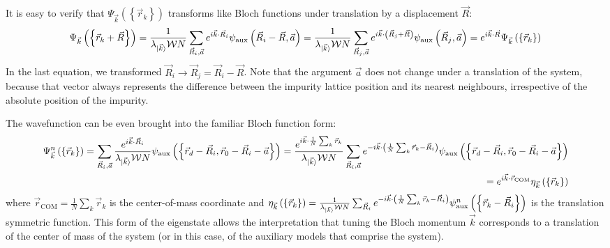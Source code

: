 \documentclass{report}
\numberwithin{equation}{section}
\begin{document}
\begin{appendices}
It is easy to verify that \(\Psi_{\vec k}\left(\left\{ \vec r_k \right\}  \right) \) transforms like Bloch functions under translation by a displacement \(\vec R\):
\begin{equation}\begin{aligned}
	\Psi_{\vec k}\left(\left\{\vec r_k + \vec R\right\} \right) = \frac{1}{\lambda_{\ket{\vec k}} \mathcal{W} N}\sum_{\vec R_i,\vec a} e^{i \vec{k}\cdot\vec{R}_i} \psi_\text{aux}\left(\vec R_i - \vec R, \vec a\right) = \frac{1}{\lambda_{\ket{\vec k}} \mathcal{W} N}\sum_{\vec R_j, \vec a} e^{i \vec{k}\cdot\left(\vec{R}_j + \vec R\right)} \psi_\text{aux}\left(\vec R_j, \vec a\right) = e^{i \vec{k}\cdot\vec{R}} \Psi_{\vec k}\left(\left\{ \vec r_k \right\} \right)
\end{aligned}\end{equation}
In the last equation, we transformed \(\vec R_i \to \vec R_j = \vec R_i - \vec R\). Note that the argument \(\vec a\) does not change under a translation of the system, because that vector always represents the difference between the impurity lattice position and its nearest neighbours, irrespective of the absolute position of the impurity.

The wavefunction can be even brought into the familiar Bloch function form:
\begin{equation}\begin{aligned}
	\Psi^n_{\vec k}\left(\left\{\vec r_k\right\}\right) = \sum_{\vec R_i, \vec a} \frac{e^{i \vec{k}\cdot\vec{R}_i}}{\lambda_{\ket{\vec k}} \mathcal{W} N} \psi_\text{aux}\left(\left\{ \vec r_d - \vec R_i, \vec r_0 - \vec R_i - \vec a \right\} \right) = \frac{e^{i \vec{k}\cdot\frac{1}{N}\sum_k \vec{r}_k}}{\lambda_{\ket{\vec k}} \mathcal{W} N}\sum_{\vec R_i, \vec a} e^{-i \vec{k}\cdot\left(\frac{1}{N}\sum_k\vec r_k - \vec{R}_i\right)} \psi_\text{aux}\left(\left\{ \vec r_d - \vec R_i, \vec r_0 - \vec R_i - \vec a \right\} \right) \\
	= e^{i \vec{k}\cdot\vec{r}_\text{COM}} \eta_{\vec k}\left(\left\{\vec r_k\right\}\right)
\end{aligned}\end{equation}
where \(\vec r_\text{COM} = \frac{1}{N}\sum_k \vec r_k\) is the center-of-mass coordinate and \(\eta_{\vec k}\left(\left\{\vec r_k\right\}\right) = \frac{1}{\lambda_{\ket{\vec k}} \mathcal{W} N}\sum_{\vec R_i} e^{-i \vec{k}\cdot\left(\frac{1}{N}\sum_k\vec r_k - \vec{R}_i\right)} \psi^n_\text{aux}\left(\left\{\vec r_k - \vec R_i\right\}\right)\) is the translation symmetric function. This form of the eigenstate allows the interpretation that tuning the Bloch momentum \(\vec k\) corresponds to a translation of the center of mass of the system (or in this case, of the auxiliary models that comprise the system).


\end{appendices}
\end{document}
